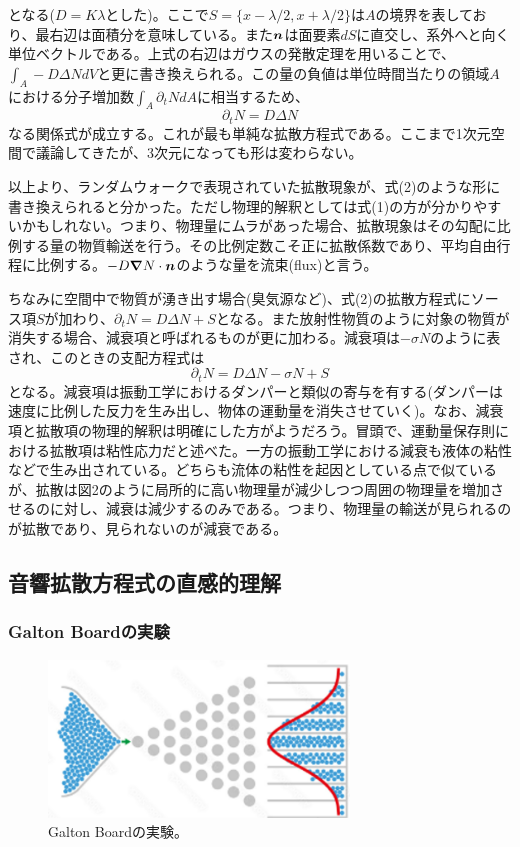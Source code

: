 \documentclass[dvipdfmx, 9pt, a4paper]{jsarticle}
\newcommand{\bm}[1]{{\mbox{\boldmath $#1$}}}
\begin{document}
となる($D=K\lambda$とした)。ここで$S=\{x-\lambda/2, x+\lambda/2 \}$は$A$の境界を表しており、最右辺は面積分を意味している。また$\bm n$は面要素$dS$に直交し、系外へと向く単位ベクトルである。上式の右辺はガウスの発散定理を用いることで、$\int_A -D\Delta NdV$と更に書き換えられる。この量の負値は単位時間当たりの領域$A$における分子増加数$\int_A \partial_tNdA$に相当するため、
\begin{equation}
\partial_t N= D\Delta N
\end{equation}
なる関係式が成立する。これが最も単純な拡散方程式である。ここまで1次元空間で議論してきたが、3次元になっても形は変わらない。\par
以上より、ランダムウォークで表現されていた拡散現象が、式(2)のような形に書き換えられると分かった。ただし物理的解釈としては式(1)の方が分かりやすいかもしれない。つまり、物理量にムラがあった場合、拡散現象はその勾配に比例する量の物質輸送を行う。その比例定数こそ正に拡散係数であり、平均自由行程に比例する。$-D\bm \nabla N \cdot \bm n$のような量を流束(flux)と言う。\par
ちなみに空間中で物質が湧き出す場合(臭気源など)、式(2)の拡散方程式にソース項$S$が加わり、$\partial_tN=D\Delta N+S$となる。また放射性物質のように対象の物質が消失する場合、減衰項と呼ばれるものが更に加わる。減衰項は$-\sigma N$のように表され、このときの支配方程式は
\begin{equation}
\partial_tN=D\Delta N-\sigma N+S
\end{equation}
となる。減衰項は振動工学におけるダンパーと類似の寄与を有する(ダンパーは速度に比例した反力を生み出し、物体の運動量を消失させていく)。なお、減衰項と拡散項の物理的解釈は明確にした方がようだろう。冒頭で、運動量保存則における拡散項は粘性応力だと述べた。一方の振動工学における減衰も液体の粘性などで生み出されている。どちらも流体の粘性を起因としている点で似ているが、拡散は図2のように局所的に高い物理量が減少しつつ周囲の物理量を増加させるのに対し、減衰は減少するのみである。つまり、物理量の輸送が見られるのが拡散であり、見られないのが減衰である。




\subsection{音響拡散方程式の直感的理解}
\subsubsection{Galton Boardの実験}

\begin{figure}[t]
\begin{center}
\includegraphics[width=8cm]{fig4.png}
\caption{Galton Boardの実験。}
\end{center}
\end{figure}
\end{document}
